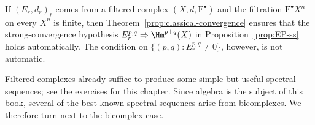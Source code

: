 If $(E_r,d_r)_r$ comes from a filtered complex
$(X,d,\mathrm{F}^\bullet)$ and the filtration
$\mathrm{F}^\bullet X^n$ on every $X^n$ is finite, then
Theorem~\ref{prop:classical-convergence} ensures that the strong-convergence
hypothesis $E_r^{p,q}\Rightarrow\Hm^{p+q}(X)$ in
Proposition~\ref{prop:EP-ss} holds automatically. The condition on
$\{(p,q):E_r^{p,q}\neq0\}$, however, is not automatic.

Filtered complexes already suffice to produce some simple but useful spectral
sequences; see the exercises for this chapter. Since algebra is the subject of
this book, several of the best-known spectral sequences arise from
bicomplexes. We therefore turn next to the bicomplex case.
